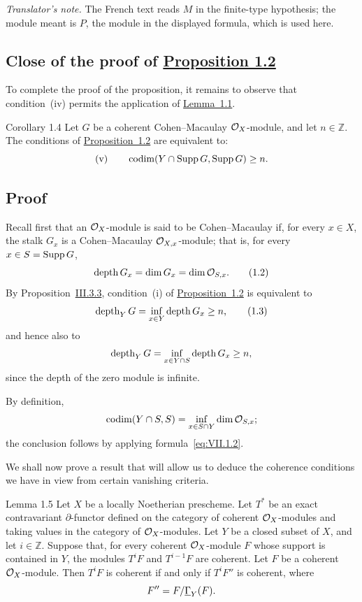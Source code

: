 \noindent\textit{Translator's note.} The French text reads $M$ in the
finite-type hypothesis; the module meant is $P$, the module in the displayed
formula, which is used here.

\subsection*{Close of the proof of \hyperref[VII.1.2]{Proposition 1.2}}
To complete the proof of the proposition, it remains to observe that
condition~(iv) permits the application of \hyperref[VII.1.1]{Lemma~1.1}.

\begin{sgastatement}{Corollary 1.4}
Let $G$ be a coherent Cohen--Macaulay $\mathcal O_X$-module, and let $n\in\mathbb Z$.
The conditions of \hyperref[VII.1.2]{Proposition~1.2} are equivalent to:
\[
  \textup{(v)}\qquad
  \operatorname{codim}(Y\cap\operatorname{Supp} G,\operatorname{Supp} G)\geq n.
\]
\end{sgastatement}

\subsection*{Proof}
Recall first that an $\mathcal O_X$-module is said to be Cohen--Macaulay if, for every
$x\in X$, the stalk $G_x$ is a Cohen--Macaulay $\mathcal O_{X,x}$-module; that is,
for every $x\in S=\operatorname{Supp} G$,
\begin{equation}
  \operatorname{depth} G_x=\dim G_x=\dim\mathcal O_{S,x}.
  \tag{1.2}\label{eq:VII.1.2}
\end{equation}
By Proposition~\hyperref[III.3.3]{III.3.3}, condition~(i) of \hyperref[VII.1.2]{Proposition~1.2} is equivalent to
\begin{equation}
  \operatorname{depth}_Y G=\inf_{x\in Y}\operatorname{depth} G_x\geq n,
  \tag{1.3}\label{eq:VII.1.3}
\end{equation}
and hence also to
\[
  \operatorname{depth}_Y G=\inf_{x\in Y\cap S}\operatorname{depth} G_x\geq n,
\]
since the depth of the zero module is infinite.

By definition,
\[
  \operatorname{codim}(Y\cap S,S)=\inf_{x\in S\cap Y}\dim\mathcal O_{S,x};
\]
the conclusion follows by applying formula~\eqref{eq:VII.1.2}.

We shall now prove a result that will allow us to deduce the coherence
conditions we have in view from certain vanishing criteria.

\begin{sgastatement}{Lemma 1.5}
Let $X$ be a locally Noetherian prescheme. Let $T^{\ast}$ be an exact
contravariant $\partial$-functor defined on the category of coherent
$\mathcal O_X$-modules and taking values in the category of $\mathcal O_X$-modules. Let $Y$ be a
closed subset of $X$, and let $i\in\mathbb Z$. Suppose that, for every coherent
$\mathcal O_X$-module $F$ whose support is contained in $Y$, the modules $T^iF$ and
$T^{i-1}F$ are coherent. Let $F$ be a coherent $\mathcal O_X$-module. Then $T^iF$ is
coherent if and only if $T^iF''$ is coherent, where
\[
  F''=F/\underline{\Gamma}_Y(F).
\]
\end{sgastatement}

